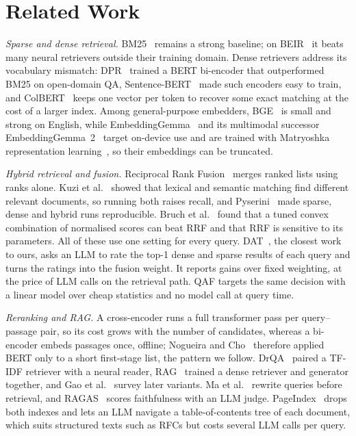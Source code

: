 \section{Related Work}
\label{sec:related}

\textit{Sparse and dense retrieval.} BM25~\cite{robertson2009bm25} remains a
strong baseline; on BEIR~\cite{thakur2021beir} it beats many neural
retrievers outside their training domain. Dense retrievers address its
vocabulary mismatch: DPR~\cite{karpukhin2020dpr} trained a BERT bi-encoder
that outperformed BM25 on open-domain QA, Sentence-BERT~\cite{reimers2019sbert}
made such encoders easy to train, and ColBERT~\cite{khattab2020colbert} keeps
one vector per token to recover some exact matching at the cost of a larger
index. Among general-purpose embedders, BGE~\cite{xiao2024cpack} is small and
strong on English, while EmbeddingGemma~\cite{vera2025embeddinggemma} and its
multimodal successor EmbeddingGemma~2~\cite{vera2026embeddinggemma2} target
on-device use and are trained with Matryoshka representation
learning~\cite{kusupati2022matryoshka}, so their embeddings can be truncated.

\textit{Hybrid retrieval and fusion.} Reciprocal Rank
Fusion~\cite{cormack2009rrf} merges ranked lists using ranks alone.
Kuzi et al.~\cite{kuzi2020hybrid} showed that lexical and semantic matching
find different relevant documents, so running both raises recall, and
Pyserini~\cite{lin2021pyserini} made sparse, dense and hybrid runs
reproducible. Bruch et al.~\cite{bruch2023fusion} found that a tuned convex
combination of normalised scores can beat RRF and that RRF is sensitive to
its parameters. All of these use one setting for every query. DAT~\cite{hsu2025dat},
the closest work to ours, asks an LLM to rate the top-1 dense and sparse
results of each query and turns the ratings into the fusion weight. It
reports gains over fixed weighting, at the price of LLM calls on the
retrieval path. QAF targets the same decision with a linear model over cheap
statistics and no model call at query time.

\textit{Reranking and RAG.} A cross-encoder runs a full transformer pass per
query--passage pair, so its cost grows with the number of candidates, whereas
a bi-encoder embeds passages once, offline; Nogueira and
Cho~\cite{nogueira2019passage} therefore applied BERT only to a short
first-stage list, the pattern we follow. DrQA~\cite{chen2017drqa} paired a
TF-IDF retriever with a neural reader, RAG~\cite{lewis2020rag} trained a
dense retriever and generator together, and Gao et al.~\cite{gao2023ragsurvey}
survey later variants. Ma et al.~\cite{ma2023rewriting} rewrite queries before retrieval, and
RAGAS~\cite{es2024ragas} scores faithfulness with an LLM judge.
PageIndex~\cite{vectify2025pageindex} drops both indexes and lets an LLM
navigate a table-of-contents tree of each document, which suits structured
texts such as RFCs but costs several LLM calls per query.
